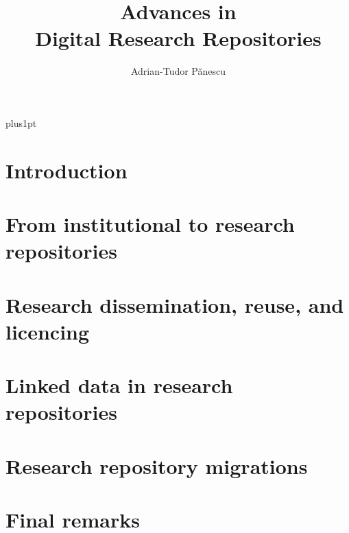 \documentclass[12pt]{ociamthesis}
\title{Advances in\\[1ex]Digital Research Repositories}
\author{Adrian-Tudor P\u{a}nescu}
\newcommand\blankpage{%
    \null
    \thispagestyle{empty}%
    \newpage}
\begin{document}
\baselineskip=18pt plus1pt

\setcounter{secnumdepth}{3}
\setcounter{tocdepth}{3}


\maketitle
\blankpage

\blankpage
\begin{romanpages}

\blankpage
\tableofcontents
\printglossary[type=\acronymtype,title=Abbreviations]
\end{romanpages}

\chapter{Introduction}
\label{ch:intro}


\chapter{From institutional to research repositories}
\label{ch:evolution}


\chapter{Research dissemination, reuse, and licencing}
\label{ch:blockchain}


\chapter{Linked data in research repositories}
\label{ch:rdf}


\chapter{Research repository migrations}
\label{ch:migration}


\chapter{Final remarks}
\label{ch:outro}


%

\renewcommand{\bibname}{References}
\printbibliography
\end{document}
